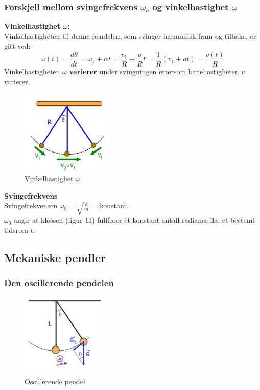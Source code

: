 \documentclass[12pt]{article}
\begin{document}
\subsubsection{Forskjell mellom svingefrekvens $\omega_o$ og vinkelhastighet $\omega$}
\textbf{Vinkelhastighet $\omega$:}\\
Vinkelhastigheten til denne pendelen, som svinger harmonisk fram og tilbake, er gitt ved:
$$\omega(t) = \frac{d\theta}{dt} = \omega_1 + \alpha t = \frac{v_1}{R} + \frac{a}{R}t = \frac{1}{R}(v_1+at) = \frac{v(t)}{R}$$
Vinkelhastigheten $\omega$ \underline{\textbf{varierer}} under svingningen ettersom banehastigheten $v$ varierer.\\
\begin{figure} [H]
    \centering
    \includegraphics[height = 4cm]{images/pendel.png}
    \caption{Vinkelhastighet $\omega$}
\end{figure}
\bigskip
\textbf{Svingefrekvens}\\
Svingefrekvensen $\omega_0 = \sqrt{\frac{k}{m}}$ = \underline{konstant}.\\
$\omega_0$ angir at klossen (figur 11) fullfører et konstant antall radianer ila. et bestemt tidsrom $t$.

\subsection{Mekaniske pendler}
\subsubsection{Den oscillerende pendelen}
\begin{figure} [H]
    \centering
    \includegraphics[height = 4cm]{images/pendel2.png}
    \caption{Oscillerende pendel}
\end{figure}
\end{document}
